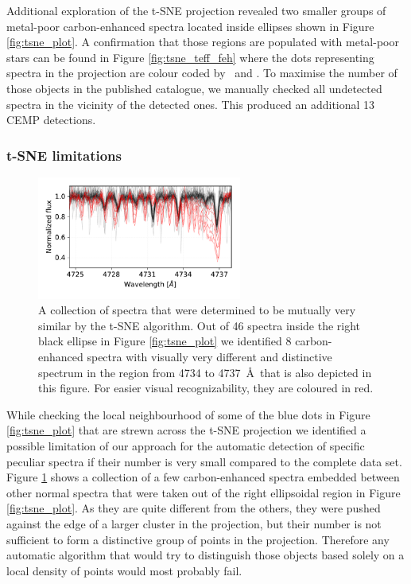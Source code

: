 Additional exploration of the t-SNE projection revealed two smaller groups of metal-poor carbon-enhanced spectra located inside ellipses shown in Figure \ref{fig:tsne_plot}. A confirmation that those regions are populated with metal-poor stars can be found in Figure \ref{fig:tsne_teff_feh} where the dots representing spectra in the projection are colour coded by \Feh\ and \Teff. To maximise the number of those objects in the published catalogue, we manually checked all undetected spectra in the vicinity of the detected ones. This produced an additional 13 CEMP detections.

\subsubsection{t-SNE limitations}
\begin{figure}
	\centering
	\includegraphics[width=0.6\textwidth]{tsne_cemp.pdf}
	\caption{A collection of spectra that were determined to be mutually very similar by the t-SNE algorithm. Out of 46 spectra inside the right black ellipse in Figure \ref{fig:tsne_plot} we identified 8 carbon-enhanced spectra with visually very different and distinctive spectrum in the region from 4734 to 4737~\AA\ that is also depicted in this figure. For easier visual recognizability, they are coloured in red.}
	\label{fig:tsne_cemps}
\end{figure}

While checking the local neighbourhood of some of the blue dots in Figure \ref{fig:tsne_plot} that are strewn across the t-SNE projection we identified a possible limitation of our approach for the automatic detection of specific peculiar spectra if their number is very small compared to the complete data set. Figure \ref{fig:tsne_cemps} shows a collection of a few carbon-enhanced spectra embedded between other normal spectra that were taken out of the right ellipsoidal region in Figure \ref{fig:tsne_plot}. As they are quite different from the others, they were pushed against the edge of a larger cluster in the projection, but their number is not sufficient to form a distinctive group of points in the projection. Therefore any automatic algorithm that would try to distinguish those objects based solely on a local density of points would most probably fail.


